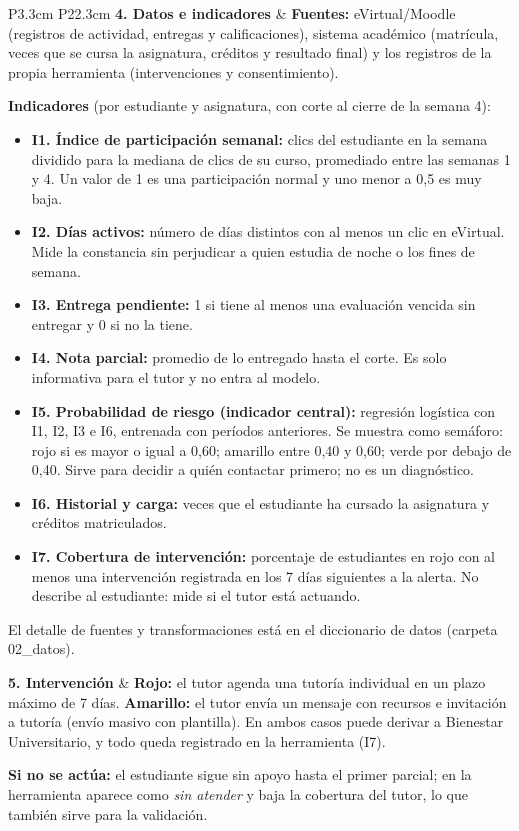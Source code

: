 \documentclass[10pt]{article}
\begin{document}
{\begin{longtable}{P{3.3cm} P{22.3cm}}
\textbf{4. Datos e indicadores}
& \textbf{Fuentes:} eVirtual/Moodle (registros de actividad, entregas y calificaciones), sistema académico (matrícula, veces que se cursa la asignatura, créditos y resultado final) y los registros de la propia herramienta (intervenciones y consentimiento).\par
\textbf{Indicadores} (por estudiante y asignatura, con corte al cierre de la semana 4):
\begin{itemize}
\item \textbf{I1. Índice de participación semanal:} clics del estudiante en la semana dividido para la mediana de clics de su curso, promediado entre las semanas 1 y 4. Un valor de 1 es una participación normal y uno menor a 0,5 es muy baja.
\item \textbf{I2. Días activos:} número de días distintos con al menos un clic en eVirtual. Mide la constancia sin perjudicar a quien estudia de noche o los fines de semana.
\item \textbf{I3. Entrega pendiente:} 1 si tiene al menos una evaluación vencida sin entregar y 0 si no la tiene.
\item \textbf{I4. Nota parcial:} promedio de lo entregado hasta el corte. Es solo informativa para el tutor y no entra al modelo.
\item \textbf{I5. Probabilidad de riesgo (indicador central):} regresión logística con I1, I2, I3 e I6, entrenada con períodos anteriores. Se muestra como semáforo: rojo si es mayor o igual a 0,60; amarillo entre 0,40 y 0,60; verde por debajo de 0,40. Sirve para decidir a quién contactar primero; no es un diagnóstico.
\item \textbf{I6. Historial y carga:} veces que el estudiante ha cursado la asignatura y créditos matriculados.
\item \textbf{I7. Cobertura de intervención:} porcentaje de estudiantes en rojo con al menos una intervención registrada en los 7 días siguientes a la alerta. No describe al estudiante: mide si el tutor está actuando.
\end{itemize}
El detalle de fuentes y transformaciones está en el diccionario de datos (carpeta 02\_datos).\\
\midrule

\textbf{5. Intervención}
& \textbf{Rojo:} el tutor agenda una tutoría individual en un plazo máximo de 7 días. \textbf{Amarillo:} el tutor envía un mensaje con recursos e invitación a tutoría (envío masivo con plantilla). En ambos casos puede derivar a Bienestar Universitario, y todo queda registrado en la herramienta (I7).\par
\textbf{Si no se actúa:} el estudiante sigue sin apoyo hasta el primer parcial; en la herramienta aparece como \emph{sin atender} y baja la cobertura del tutor, lo que también sirve para la validación.\\
\midrule


\end{longtable}}
\end{document}

